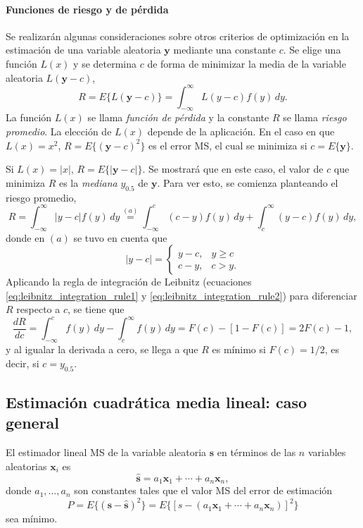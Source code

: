 \documentclass[a4paper]{report}
\newcommand{\x}{\mathbf{x}}
\newcommand{\y}{\mathbf{y}}
\newcommand{\s}{\mathbf{s}}
\begin{document}
\paragraph{Funciones de riesgo y de pérdida} Se realizarán algunas consideraciones sobre otros criterios de optimización en la estimación de una variable aleatoria \(\y\) mediante una constante \(c\). Se elige una función \(L(x)\) y se determina \(c\) de forma de minimizar la media de la variable aleatoria \(L(\y-c)\),
\[
 R=E\{L(\y-c)\}=\int_{-\infty}^{\infty}L(y-c)f(y)\,dy.
\]
La función \(L(x)\) se llama \emph{función de pérdida} y la constante \(R\) se llama \emph{riesgo promedio}. La elección de \(L(x)\) depende de la aplicación. En el caso en que \(L(x)=x^2\), \(R=E\{(\y-c)^2\}\) es el error MS, el cual se minimiza si \(c=E\{\y\}\).

Si \(L(x)=|x|\), \(R=E\{|\y-c|\}\). Se mostrará que en este caso, el valor de \(c\) que minimiza \(R\) es la \emph{mediana} \(y_{0.5}\) de \(\y\). Para ver esto, se comienza planteando el riesgo promedio,
\[
 R=\int_{-\infty}^{\infty}|y-c|f(y)\,dy\overset{(a)}{=}\int_{-\infty}^{c}(c-y)f(y)\,dy+\int_{c}^{\infty}(y-c)f(y)\,dy,
\]
donde en \((a)\) se tuvo en cuenta que
\[
 |y-c|=
 \left\{\begin{array}{ll}
  y-c, & y\geq c \\
  c-y, & c > y.
 \end{array} \right.
\]
Aplicando la regla de integración de Leibnitz (ecuaciones \ref{eq:leibnitz_integration_rule1} y \ref{eq:leibnitz_integration_rule2}) para diferenciar \(R\) respecto a \(c\), se tiene que
\[
 \frac{dR}{dc}=\int_{-\infty}^{c}f(y)\,dy-\int_{c}^{\infty}f(y)\,dy=F(c)-[1-F(c)]=2F(c)-1,
\]
y al igualar la derivada a cero, se llega a que \(R\) es mínimo si \(F(c)=1/2\), es decir, si \(c=y_{0.5}\).

\subsection{Estimación cuadrática media lineal: caso general}

El estimador lineal MS de la variable aleatoria \(\s\) en términos de las \(n\) variables aleatorias \(\x_i\) es
\[
 \hat{\s}=a_1\x_1+\cdots+a_n\x_n,
\]
donde \(a_1,\dots, a_n\) son constantes tales que el valor MS del error de estimación
\begin{equation}\label{eq:linear_general_case_mse}
 P=E\{(\s-\hat{\s})^2\}=E\{[s-(a_1\x_1+\cdots+a_n\x_n)]^2\}
\end{equation}
sea mínimo.
\end{document}
